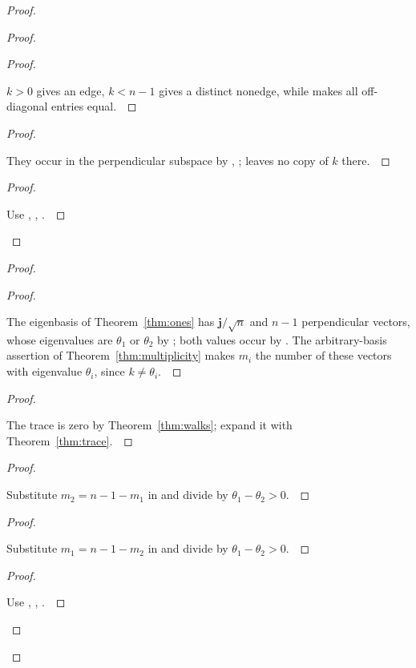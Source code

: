 \documentclass[11pt]{amsart}
\let\qed\relax
\newcommand\Zj{{\mathbf j}}
\theoremstyle{definition}
\begin{document}
\begin{proof}
\begin{proof}
\begin{proof}
\pf\ \raggedright $k>0$ gives an edge, $k<n-1$ gives a distinct nonedge, while  makes all off-diagonal entries equal.~\qed
\end{proof}
\begin{proof}
\pf\ \raggedright They occur in the perpendicular subspace by , ;  leaves no copy of $k$ there.~\qed
\end{proof}
\qedstep
\begin{proof}
\pf\ \raggedright Use , , .~\qed
\end{proof}
\end{proof}
\begin{proof}
\begin{proof}
\pf\ \raggedright The eigenbasis of Theorem~\ref{thm:ones} has $\Zj/\sqrt n$ and $n-1$ perpendicular vectors, whose eigenvalues are $\theta_1$ or $\theta_2$ by ; both values occur by . The arbitrary-basis assertion of Theorem~\ref{thm:multiplicity} makes $m_i$ the number of these vectors with eigenvalue $\theta_i$, since $k\ne\theta_i$.~\qed
\end{proof}
\begin{proof}
\pf\ \raggedright The trace is zero by Theorem~\ref{thm:walks}; expand it with Theorem~\ref{thm:trace}.~\qed
\end{proof}
\begin{proof}
\pf\ \raggedright Substitute $m_2=n-1-m_1$ in  and divide by $\theta_1-\theta_2>0$.~\qed
\end{proof}
\begin{proof}
\pf\ \raggedright Substitute $m_1=n-1-m_2$ in  and divide by $\theta_1-\theta_2>0$.~\qed
\end{proof}
\qedstep
\begin{proof}
\pf\ \raggedright Use , , .~\qed

\end{proof}
\end{proof}
\end{proof}
\end{document}

